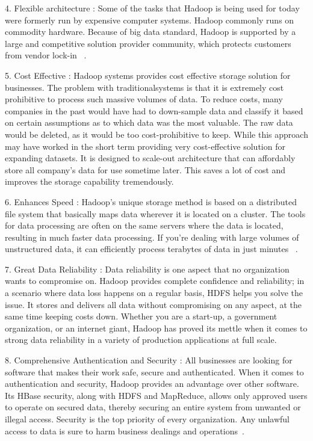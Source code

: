 4. Flexible architecture : 
Some of the tasks that Hadoop is being used for today were formerly run by 
expensive computer systems. Hadoop commonly runs on commodity hardware. Because 
of big data standard, Hadoop is supported by a large and competitive solution 
provider community, which protects customers from vendor lock-in
~\cite{hid-sp18-406-hadoop-intro9}.

5. Cost Effective : 
Hadoop systems provides cost effective storage solution for businesses. The 
problem with traditionalsystems is that it is extremely cost prohibitive to 
process such massive volumes of data. To reduce costs, many companies in the 
past would have had to down-sample data and classify it based on certain 
assumptions as to which data was the most valuable. The raw data would be 
deleted, as it would be too cost-prohibitive to keep. While this approach may 
have worked in the short term providing very cost-effective solution for 
expanding datasets. It is designed to scale-out architecture that can affordably
store all company's data for use sometime later. This saves a lot of cost and 
improves the storage capability tremendously.

6. Enhances Speed : 
Hadoop's unique storage method is based on a distributed file system that 
basically maps data wherever it is located on a cluster. The tools for data 
processing are often on the same servers where the data is located, resulting 
in much faster data processing. If you’re dealing with large volumes of 
unstructured data, it can efficiently process terabytes of data in just minutes
~\cite{hid-sp18-406-hadoop-intro10}.

7. Great Data Reliability : 
Data reliability is one aspect that no organization wants to compromise on. 
Hadoop provides complete confidence and reliability; in a scenario where data 
loss happens on a regular basis, HDFS helps you solve the issue. It stores and 
delivers all data without compromising on any aspect, at the same time keeping 
costs down. Whether you are a start-up, a government organization, or an 
internet giant, Hadoop has proved its mettle when it comes to strong data 
reliability in a variety of production applications at full scale.

8. Comprehensive Authentication and Security : 
All businesses are looking for software that makes their work safe, secure and 
authenticated. When it comes to authentication and security, Hadoop provides an 
advantage over other software. Its HBase security, along with HDFS and 
MapReduce, allows only approved users to operate on secured data, thereby 
securing an entire system from unwanted or illegal access. Security is the top 
priority of every organization. Any unlawful access to data is sure to harm 
business dealings and operations~\cite{hid-sp18-406-hadoop-intro11}.


